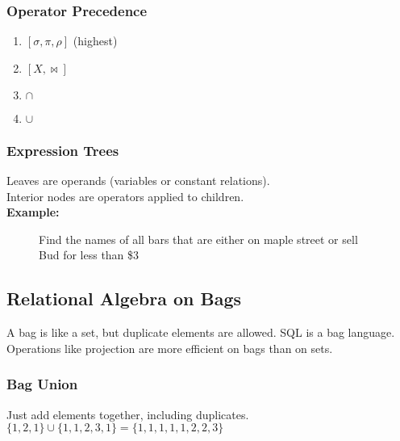 \documentclass[12pt]{article}
\begin{document}
\subsubsection{Operator Precedence}
\begin{enumerate}
    \item{$[\sigma,\pi,\rho]$ (highest)}
    \item{$[X,\Join]$}
    \item{$\cap$}
    \item{$\cup$}
\end{enumerate}


\subsubsection{Expression Trees}
Leaves are operands (variables or constant relations).\\
Interior nodes are operators applied to children.\\
\textbf{Example:}\\

\begin{figure}[H]
\caption{Find the names of all bars that are either on maple street or sell Bud
for less than \$3}
\end{figure}

\subsection{Relational Algebra on Bags}
A bag is like a set, but duplicate elements are allowed. SQL is a bag
language. Operations like projection are more efficient on bags than on sets.
\subsubsection{Bag Union}
Just add elements together, including duplicates.\\
$\{1,2,1\} \cup \{1,1,2,3,1\} = \{1,1,1,1,1,2,2,3\}$
\end{document}
